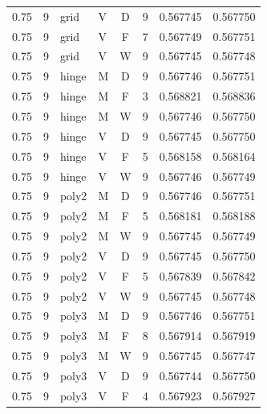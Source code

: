 \begin{longtable}{rrllcrrr}
0.75 & 9 & grid & V & D & 9 & 0.567745 & 0.567750 \\

0.75 & 9 & grid & V & F & 7 & 0.567749 & 0.567751 \\

0.75 & 9 & grid & V & W & 9 & 0.567745 & 0.567748 \\

0.75 & 9 & hinge & M & D & 9 & 0.567746 & 0.567751 \\

0.75 & 9 & hinge & M & F & 3 & 0.568821 & 0.568836 \\

0.75 & 9 & hinge & M & W & 9 & 0.567746 & 0.567750 \\

0.75 & 9 & hinge & V & D & 9 & 0.567745 & 0.567750 \\

0.75 & 9 & hinge & V & F & 5 & 0.568158 & 0.568164 \\

0.75 & 9 & hinge & V & W & 9 & 0.567746 & 0.567749 \\

0.75 & 9 & poly2 & M & D & 9 & 0.567746 & 0.567751 \\

0.75 & 9 & poly2 & M & F & 5 & 0.568181 & 0.568188 \\

0.75 & 9 & poly2 & M & W & 9 & 0.567745 & 0.567749 \\

0.75 & 9 & poly2 & V & D & 9 & 0.567745 & 0.567750 \\

0.75 & 9 & poly2 & V & F & 5 & 0.567839 & 0.567842 \\

0.75 & 9 & poly2 & V & W & 9 & 0.567745 & 0.567748 \\

0.75 & 9 & poly3 & M & D & 9 & 0.567746 & 0.567751 \\

0.75 & 9 & poly3 & M & F & 8 & 0.567914 & 0.567919 \\

0.75 & 9 & poly3 & M & W & 9 & 0.567745 & 0.567747 \\

0.75 & 9 & poly3 & V & D & 9 & 0.567744 & 0.567750 \\

0.75 & 9 & poly3 & V & F & 4 & 0.567923 & 0.567927 \\


\end{longtable}
